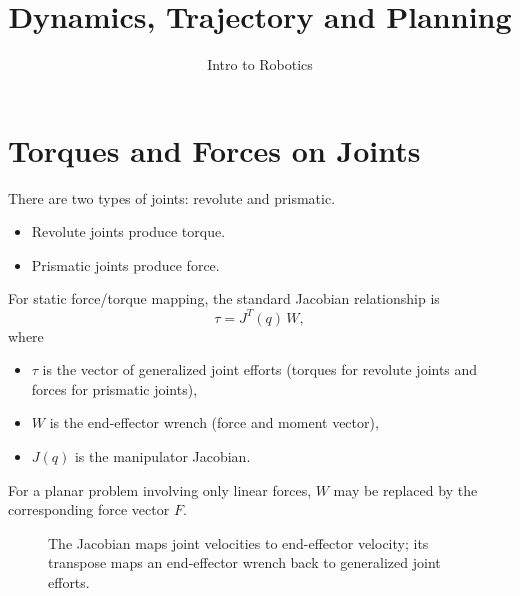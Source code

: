 \documentclass[11pt]{article}
\title{Dynamics, Trajectory and Planning}
\author{Intro to Robotics}
\date{}
\begin{document}
\maketitle

\section{Torques and Forces on Joints}

There are two types of joints: revolute and prismatic.

\begin{itemize}
    \item Revolute joints produce torque.
    \item Prismatic joints produce force.
\end{itemize}

For static force/torque mapping, the standard Jacobian relationship is
\[
\boxed{\tau = J^T(q)\,W},
\]
where
\begin{itemize}
    \item $\tau$ is the vector of generalized joint efforts (torques for revolute joints and forces for prismatic joints),
    \item $W$ is the end-effector wrench (force and moment vector),
    \item $J(q)$ is the manipulator Jacobian.
\end{itemize}
For a planar problem involving only linear forces, $W$ may be replaced by the corresponding force vector $F$.

\begin{figure}[ht]
\centering
{}
\caption{The Jacobian maps joint velocities to end-effector velocity; its transpose maps an end-effector wrench back to generalized joint efforts.}
\end{figure}
\end{document}

